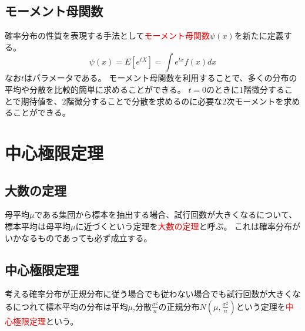 \documentclass[a4paper,10pt]{jarticle}
\begin{document}
\subsection{モーメント母関数}
確率分布の性質を表現する手法として\textcolor{red}{モーメント母関数}$\psi(x)$を新たに定義する。
\begin{equation}
    \psi(x) = E[e^{tX}] = \int e^{tx}f(x)dx\tag{3,15}
\end{equation}
なお$t$はパラメータである。
モーメント母関数を利用することで、多くの分布の平均や分散を比較的簡単に求めることができる。
$t=0$のときに1階微分することで期待値を、2階微分することで分散を求めるのに必要な2次モーメントを求めることができる。
\section{中心極限定理}
\subsection{大数の定理}
母平均$\mu$である集団から標本を抽出する場合、試行回数が大きくなるについて、標本平均は母平均$\mu$に近づくという定理を\textcolor{red}{大数の定理}と呼ぶ。
これは確率分布がいかなるものであっても必ず成立する。
\subsection{中心極限定理}
考える確率分布が正規分布に従う場合でも従わない場合でも試行回数が大きくなるにつれて標本平均の分布は平均$\mu$,分散$\frac{\sigma^2}{n}$の正規分布$N(\mu,\frac{\sigma^2}{n})$という定理を\textcolor{red}{中心極限定理}という。
\end{document}
